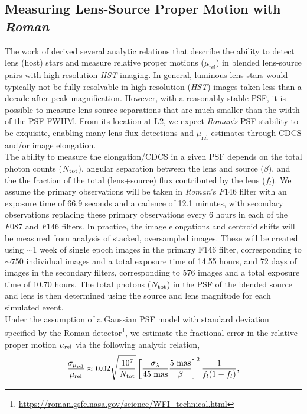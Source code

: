 \documentclass[twocolumn]{aastex631}
\begin{document}
\subsection{Measuring Lens-Source Proper Motion with \textit{Roman}} \label{subsec:murel_description}
\noindent The work of \cite*{bennett:2007a} derived several analytic relations that describe the ability to detect lens (host) stars and measure relative proper motions ($\mu_{\textrm{rel}}$) in blended lens-source pairs with high-resolution \textit{HST} imaging. In general, luminous lens stars would typically not be fully resolvable in high-resolution (\textit{HST}) images taken less than a decade after peak magnification. However, with a reasonably stable PSF, it is possible to measure lens-source separations that are much smaller than the width of the PSF FWHM. From its location at L2, we expect \textit{Roman's} PSF stability to be exquisite, enabling many lens flux detections and $\mu_{\textrm{rel}}$ estimates through CDCS and/or image elongation.\\
\indent The ability to measure the elongation/CDCS in a given PSF depends on the total photon counts ($N_{\rm tot}$), angular separation between the lens and source ($\beta$), and the the fraction of the total (lens+source) flux contributed by the lens ($f_l$). We assume the primary observations will be taken in \textit{Roman}'s $F146$ filter with an exposure time of 66.9 seconds and a cadence of 12.1 minutes, with secondary observations replacing these primary observations every 6 hours in each of the $F087$ and $F146$ filters. In practice, the image elongations and centroid shifts will be measured from analysis of stacked, oversampled images. These will be created using ${\sim}$1 week of single epoch images in the primary F146 filter, corresponding to ${\sim}750$ individual images and a total exposure time of 14.55 hours, and 72 days of images in the secondary filters, corresponding to 576 images and a total exposure time of 10.70 hours. The total photons ($N_{\rm tot}$) in the PSF of the blended source and lens is then determined using the source and lens magnitude for each simulated event.\\
\indent Under the assumption of a Gaussian PSF model with standard deviation specified by the Roman detector\footnote{\url{https://roman.gsfc.nasa.gov/science/WFI_technical.html}}, we estimate the fractional error in the relative proper motion $\mu_{\rm rel}$ via the following analytic relation,
\begin{equation}\label{eq:image_elong}
    \frac{\sigma_{\mu_{\rm rel}}}{\mu_{\rm rel}} \approx 0.02 \sqrt{\frac{10^7}{ N_{\rm tot}}} \left[\frac{\sigma_\lambda}{45~{\rm mas}} \frac{5 ~{\rm mas}}{\beta}\right]^2 \frac{1}{f_l(1-f_l)},
\end{equation}
\end{document}
